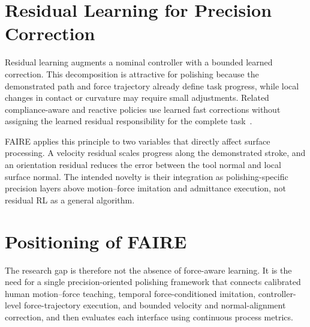 \section{Residual Learning for Precision Correction}
Residual learning augments a nominal controller with a bounded learned correction. This decomposition is attractive for polishing because the demonstrated path and force trajectory already define task progress, while local changes in contact or curvature may require small adjustments. Related compliance-aware and reactive policies use learned fast corrections without assigning the learned residual responsibility for the complete task~\cite{hou2025adaptivecompliance,xue2025reactivediffusion}.

FAIRE applies this principle to two variables that directly affect surface processing. A velocity residual scales progress along the demonstrated stroke, and an orientation residual reduces the error between the tool normal and local surface normal. The intended novelty is their integration as polishing-specific precision layers above motion--force imitation and admittance execution, not residual RL as a general algorithm.

\section{Positioning of FAIRE}
\begin{table}[t]
\centering
\caption{Functional positioning of representative related approaches. Desired force denotes a policy-generated reference rather than force observation alone.}
\label{tab:related_work_comparison}
\small
{}
\end{table}

The research gap is therefore not the absence of force-aware learning. It is the need for a single precision-oriented polishing framework that connects calibrated human motion--force teaching, temporal force-conditioned imitation, controller-level force-trajectory execution, and bounded velocity and normal-alignment correction, and then evaluates each interface using continuous process metrics.
